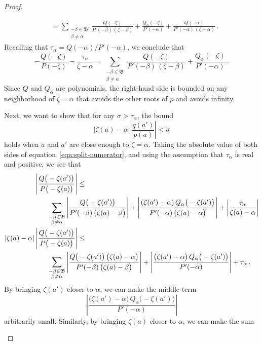\documentclass{article}
\theoremstyle{definition}
\theoremstyle{plain}
\newcommand{\roots}{\mathfrak{B}}
\begin{document}
\begin{proof}
\begin{itemize}
\begin{align*}
&=\sum_{\substack{-\beta \in \roots \\ \beta \neq \alpha}} \frac{Q(-\zeta)}{P'(-\beta)\,(\zeta - \beta)} + \frac{Q_\alpha(-\zeta)}{P'(-\alpha)} + \frac{Q(-\alpha)}{P'(-\alpha)\,(\zeta - \alpha)}\,.
\end{align*}
Recalling that $\tau_\alpha = Q(-\alpha)/P'(-\alpha)$, we conclude that
\[-\frac{Q(-\zeta)}{P(-\zeta)}-\frac{\tau_\alpha}{\zeta-\alpha}=\sum_{\substack{-\beta \in \roots \\ \beta \neq \alpha}} \frac{Q(-\zeta)}{P'(-\beta)\,(\zeta - \beta)} + \frac{Q_\alpha(-\zeta)}{P'(-\alpha)}\,. \]
Since $Q$ and $Q_\alpha$ are polynomials, the right-hand side is bounded on any neighborhood of $\zeta = \alpha$ that avoids the other roots of $p$ and avoids infinity.

Next, we want to show that for any $\sigma > \tau_\alpha$, the bound
\[ |\zeta(a) - \alpha| \left|\frac{q(a')}{p(a)}\right| < \sigma \]
holds when $a$ and $a'$ are close enough to $\zeta = \alpha$. Taking the absolute value of both sides of equation~\eqref{eqn:split-numerator}, and using the assumption that $\tau_\alpha$ is real and positive, we see that
\begin{align*}
\left|\frac{Q\big(-\zeta(a')\big)}{P\big(-\zeta(a)\big)}\right| & \le \\ & \hspace{-15mm} \sum_{\substack{-\beta \in \roots \\ \beta \neq \alpha}} \left|\frac{Q\big(-\zeta(a')\big)}{P'(-\beta)\,\big(\zeta(a) - \beta\big)}\right| + \left|\frac{(\zeta(a') - \alpha)\,Q_\alpha\big(-\zeta(a')\big)}{P'(-\alpha)\,\big(\zeta(a) - \alpha\big)}\right| + \left|\frac{\tau_\alpha}{\zeta(a) - \alpha}\right| \\
|\zeta(a) - \alpha|\left|\frac{Q\big(-\zeta(a')\big)}{P\big(-\zeta(a)\big)}\right| & \le \\
& \hspace{-15mm} \sum_{\substack{-\beta \in \roots \\ \beta \neq \alpha}} \left|\frac{Q\big(-\zeta(a')\big)\,\big(\zeta(a) - \alpha\big)}{P'(-\beta)\,\big(\zeta(a) - \beta\big)}\right| + \left|\frac{\big(\zeta(a') - \alpha\big)\,Q_\alpha\big(-\zeta(a')\big)}{P'(-\alpha)}\right| + \tau_\alpha\,.
\end{align*}
By bringing $\zeta(a')$ closer to $\alpha$, we can make the middle term
\[\left|\frac{\big(\zeta(a') - \alpha\big)\,Q_\alpha\big(-\zeta(a')\big)}{P'(-\alpha)}\right|\]
arbitrarily small. Similarly, by bringing $\zeta(a)$ closer to $\alpha$, we can make the sum

\end{itemize}
\end{proof}
\end{document}
